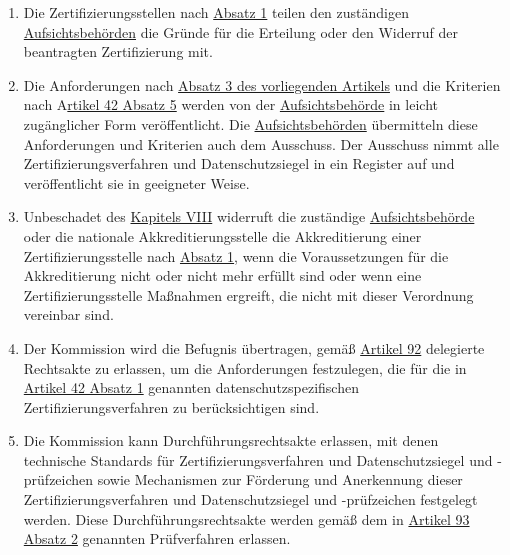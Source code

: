 \begin{enumerate}
  \item Die Zertifizierungsstellen nach \hyperref[itm:43-1]{Absatz 1} teilen den zuständigen \hyperref[itm:04-21]{Aufsichtsbehörden} die
   Gründe für die Erteilung oder den Widerruf der beantragten Zertifizierung mit.
  \label{itm:43-5}

  \item Die Anforderungen nach \hyperref[itm:43-3]{Absatz 3 des vorliegenden Artikels} und die Kriterien nach A\hyperref
   [itm:42-5]{rtikel 42 Absatz 5} werden von der \hyperref[itm:04-21]{Aufsichtsbehörde} in leicht zugänglicher Form veröffentlicht. Die
   \hyperref[itm:04-21]{Aufsichtsbehörden} übermitteln diese Anforderungen und Kriterien auch dem Ausschuss. Der Ausschuss nimmt alle
   Zertifizierungsverfahren und Datenschutzsiegel in ein Register auf und veröffentlicht sie in geeigneter Weise.
  \label{itm:43-6}

  \item Unbeschadet des \hyperref[part:8]{Kapitels VIII} widerruft die zuständige \hyperref[itm:04-21]{Aufsichtsbehörde} oder die nationale
   Akkreditierungsstelle die Akkreditierung einer Zertifizierungsstelle nach \hyperref[itm:43-1]{Absatz 1}, wenn die
   Voraussetzungen für die Akkreditierung nicht oder nicht mehr erfüllt sind oder wenn eine Zertifizierungsstelle
   Maßnahmen ergreift, die nicht mit dieser Verordnung vereinbar sind.
  \label{itm:43-7}

  \item Der Kommission wird die Befugnis übertragen, gemäß \hyperref[ch:92]{Artikel 92} delegierte Rechtsakte zu
   erlassen, um die Anforderungen festzulegen, die für die in \hyperref[itm:42-1]{Artikel 42 Absatz 1} genannten
   datenschutzspezifischen Zertifizierungsverfahren zu berücksichtigen sind.
  \label{itm:43-8}

  \item Die Kommission kann Durchführungsrechtsakte erlassen, mit denen technische Standards für
   Zertifizierungsverfahren und Datenschutzsiegel und -prüfzeichen sowie Mechanismen zur Förderung und Anerkennung
   dieser Zertifizierungsverfahren und Datenschutzsiegel und -prüfzeichen festgelegt werden. Diese
   Durchführungsrechtsakte werden gemäß dem in \hyperref[itm:93-2]{Artikel 93 Absatz 2} genannten Prüfverfahren
   erlassen.
  \label{itm:43-9}

\end{enumerate}


